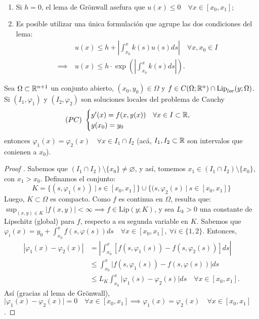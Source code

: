 \begin{observe}~
	\begin{enumerate}
		\item Si $h=0$, el lema de Grönwall asefura que $u(x) \leq 0 \quad \forall x \in [x_{0},x_{1}]$;

		\item Es posible utilizar una única formulación que agrupe las dos condiciones del lema:
		\begin{align*}
			& u(x) \leq h + \left| \int_{x_{0}}^{x}k(s)u(s)ds \right| \quad \forall x,x_{0}\in I \\
			\implies \ & u(x) \leq h \cdot \exp \left( \left| \int_{x_{0}}^{x} k(s)ds \right| \right)
		.\end{align*}
	\end{enumerate}
\end{observe}

\begin{theorem}
	Sea $\Omega \subset \mathbb{R}^{n+1}$ un conjunto abierto, $(x_{0},y_{0}) \in \Omega$ y $f \in C(\Omega;\mathbb{R}^n) \cap \text{Lip}_{loc}(y;\Omega)$. Si $(I_1,\varphi_1)$ y $(I_2,\varphi_{2})$ son soluciones locales del problema de Cauchy
	\[ (PC) \ \begin{cases}
		y'(x) = f(x,y(x)) \quad \forall x \in I \subset \mathbb{R}, \\
		y(x_{0}) = y_{0}
	\end{cases} \]
	entonces $\varphi_{1}(x) = \varphi_{2}(x)\quad \forall x \in I_1 \cap I_2$ (acá, $I_1,I_{2} \subset \mathbb{R}$ son intervalos que conienen a $x_{0}$).
\end{theorem}
\begin{proof}[Proof ]
	Sabemos que $(I_1 \cap I_{2}) \setminus \{x_{0}\} \neq \varnothing$, y así, tomemos $x_{1} \in (I_{1} \cap I_{2}) \setminus \{x_{0}\}$, con $x_{1} > x_{0}$. Definamos el conjunto:
	\[ K = \{ (s,\varphi_{1}(s)) \ \big| \ s \in [x_{0},x_{1}] \} \cup \{ (s,\varphi_{2}(s) \ \big| \ s \in [x_{0},x_{1}] \} \] 
	Luego, $K \subset \Omega$ es compacto. Como $f$ es continua en $\Omega$, resulta que: $\sup_{(x,y) \in K} |f(x,y)| < \infty \implies f \in \text{Lip}(y;K)$, y sea $L_k > 0$ una constante de Lipschitz (global) para $f$, respecto a su segunda variable en $K$. Sabemos que $\varphi_{i}(x) = y_0 + \int_{x_{0}}^{x} f(s,\varphi(s))ds \quad \forall x \in [x_0,x_{1}],\ \forall i \in \{1,2\}$. Entonces,
	\begin{align*}
		|\varphi_{1}(x) - \varphi_{2}(x)| &= \left| \int_{x_{0}}^{x} [f(s,\varphi_{1}(s)) - f(s,\varphi_{2}(s))]ds \right| \\
		& \leq \int_{x_{0}}^{x} \big|f(s,\varphi_{1}(s)) - f(s,\varphi(s))\big| ds \\
		& \leq L_K \int_{x_{0}}^{x} \big| \varphi_{1}(s) - \varphi_{2}(s) \big| ds \quad \forall x \in [x_{0},x_{1}]
	.\end{align*}
	Así (gracias al lema de Grönwall), $\big| \varphi_{1}(x) - \varphi_{2}(x) \big| = 0 \quad \forall x \in [x_{0},x_{1}] \implies \varphi_{1}(x) = \varphi_{2}(x) \quad \forall x \in [x_{0},x_{1}]$.
\end{proof}
